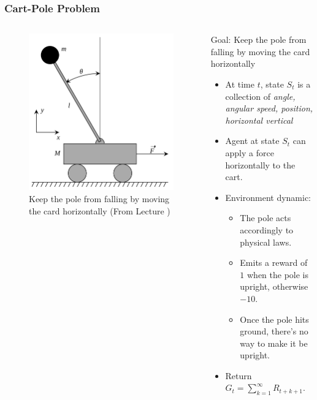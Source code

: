 \documentclass[10pt]{beamer}
\theoremstyle{remark}
\begin{document}
\begin{frame}
    \frametitle{Cart-Pole Problem}
    \begin{columns}
    \begin{column}{0.4\textwidth}
        \begin{figure}
            \includegraphics[width=\textwidth]{figures/pole-balance.png}
            \caption{Keep the pole from falling by moving the card horizontally (From Lecture \footnotemark)}
        \end{figure}
    \end{column}
    \begin{column}{0.7\textwidth}  %
        Goal: Keep the pole from falling by moving the card horizontally

        \begin{itemize}
            \item At time $t$, state $S_t$ is a collection of \textit{angle, angular speed, position, horizontal vertical}
            \item Agent at state $S_t$ can apply a force horizontally to the cart.
            \item Environment dynamic: 
                \begin{itemize}
                    \item The pole acts accordingly to physical laws.
                    \item Emits a reward of $1$ when the pole is upright, otherwise $-10$.
                    \item Once the pole hits ground, there's no way to make it be upright.
                \end{itemize}
            \item Return $G_t = \sum^{\infty}_{k=1} R_{t+k+1} $.


\end{itemize}
\end{column}
\end{columns}
\end{frame}
\end{document}
